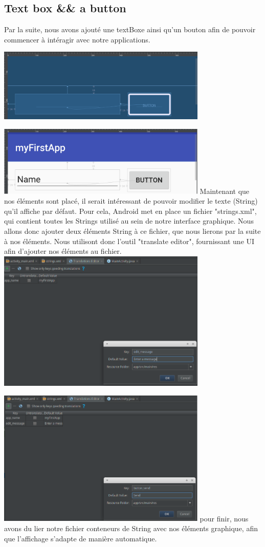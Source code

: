 \documentclass[french,a4paper,12pt]{report}
\begin{document}
\subsection{Text box && a button}
Par la suite, nous avons ajouté une textBoxe ainsi qu'un bouton afin de pouvoir
commencer à intéragir avec notre applications.

\includegraphics[width=10cm]{15.png}

\includegraphics[width=10cm]{16.png}
\bigbreak
Maintenant que nos éléments sont placé, il serait intéressant de pouvoir modifier
le texte (String) qu'il affiche par défaut. Pour cela, Android met en place un
fichier "strings.xml", qui contient toutes les Strings utilisé au sein de notre
interface graphique. Nous allons donc ajouter deux éléments String à ce fichier,
que nous lierons par la suite à nos éléments.
\smallbreak
Nous utilisont donc l'outil "translate editor", fournissant une UI afin d'ajouter
nos éléments au fichier.
\bigbreak
\includegraphics[width=10cm]{17.png}

\includegraphics[width=10cm]{18.png}
\bigbreak
pour finir, nous avons du lier notre fichier conteneurs de String avec nos
éléments graphique, afin que l'affichage s'adapte de manière automatique.
\end{document}
